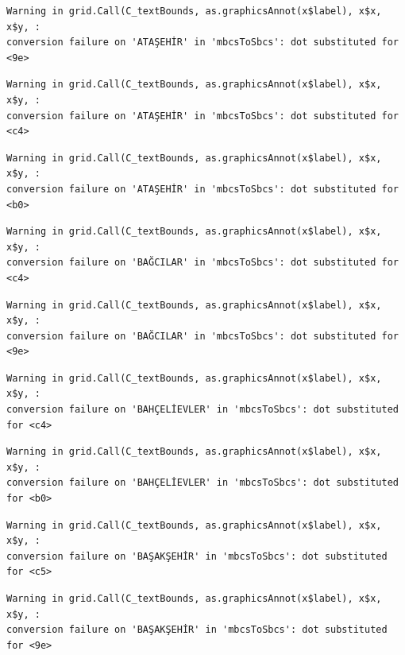 \documentclass[
  11pt,
  a4paper,
  DIV=11,
  numbers=noendperiod]{scrartcl}
\begin{document}
\begin{verbatim}
Warning in grid.Call(C_textBounds, as.graphicsAnnot(x$label), x$x, x$y, :
conversion failure on 'ATAŞEHİR' in 'mbcsToSbcs': dot substituted for <9e>
\end{verbatim}

\begin{verbatim}
Warning in grid.Call(C_textBounds, as.graphicsAnnot(x$label), x$x, x$y, :
conversion failure on 'ATAŞEHİR' in 'mbcsToSbcs': dot substituted for <c4>
\end{verbatim}

\begin{verbatim}
Warning in grid.Call(C_textBounds, as.graphicsAnnot(x$label), x$x, x$y, :
conversion failure on 'ATAŞEHİR' in 'mbcsToSbcs': dot substituted for <b0>
\end{verbatim}

\begin{verbatim}
Warning in grid.Call(C_textBounds, as.graphicsAnnot(x$label), x$x, x$y, :
conversion failure on 'BAĞCILAR' in 'mbcsToSbcs': dot substituted for <c4>
\end{verbatim}

\begin{verbatim}
Warning in grid.Call(C_textBounds, as.graphicsAnnot(x$label), x$x, x$y, :
conversion failure on 'BAĞCILAR' in 'mbcsToSbcs': dot substituted for <9e>
\end{verbatim}

\begin{verbatim}
Warning in grid.Call(C_textBounds, as.graphicsAnnot(x$label), x$x, x$y, :
conversion failure on 'BAHÇELİEVLER' in 'mbcsToSbcs': dot substituted for <c4>
\end{verbatim}

\begin{verbatim}
Warning in grid.Call(C_textBounds, as.graphicsAnnot(x$label), x$x, x$y, :
conversion failure on 'BAHÇELİEVLER' in 'mbcsToSbcs': dot substituted for <b0>
\end{verbatim}

\begin{verbatim}
Warning in grid.Call(C_textBounds, as.graphicsAnnot(x$label), x$x, x$y, :
conversion failure on 'BAŞAKŞEHİR' in 'mbcsToSbcs': dot substituted for <c5>
\end{verbatim}

\begin{verbatim}
Warning in grid.Call(C_textBounds, as.graphicsAnnot(x$label), x$x, x$y, :
conversion failure on 'BAŞAKŞEHİR' in 'mbcsToSbcs': dot substituted for <9e>
\end{verbatim}
\end{document}
